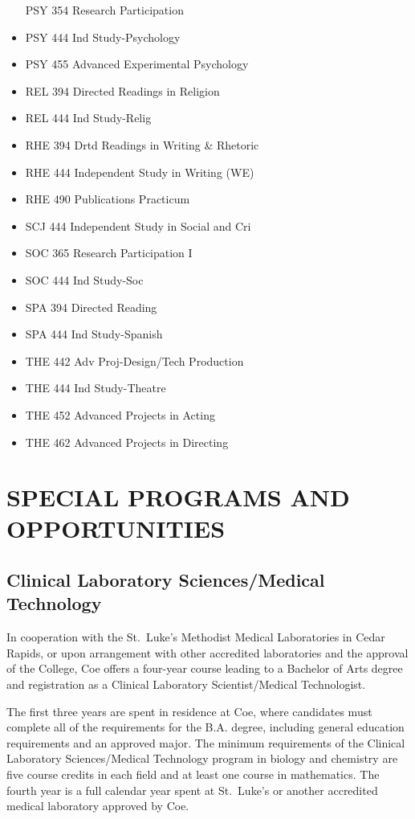 \documentclass[
  letterpaper,
]{scrbook}
\begin{document}
\begin{itemize}
  PSY 354 Research Participation
\item
  PSY 444 Ind Study-Psychology
\item
  PSY 455 Advanced Experimental Psychology
\item
  REL 394 Directed Readings in Religion
\item
  REL 444 Ind Study-Relig
\item
  RHE 394 Drtd Readings in Writing \& Rhetoric
\item
  RHE 444 Independent Study in Writing (WE)
\item
  RHE 490 Publications Practicum
\item
  SCJ 444 Independent Study in Social and Cri
\item
  SOC 365 Research Participation I
\item
  SOC 444 Ind Study-Soc
\item
  SPA 394 Directed Reading
\item
  SPA 444 Ind Study-Spanish
\item
  THE 442 Adv Proj-Design/Tech Production
\item
  THE 444 Ind Study-Theatre
\item
  THE 452 Advanced Projects in Acting
\item
  THE 462 Advanced Projects in Directing
\end{itemize}

\hypertarget{special-programs-and-opportunities}{%
\chapter{SPECIAL PROGRAMS AND
OPPORTUNITIES}\label{special-programs-and-opportunities}}

\hypertarget{clinical-laboratory-sciencesmedical-technology}{%
\section{Clinical Laboratory Sciences/Medical
Technology}\label{clinical-laboratory-sciencesmedical-technology}}

In cooperation with the St.~Luke's Methodist Medical Laboratories in
Cedar Rapids, or upon arrangement with other accredited laboratories and
the approval of the College, Coe offers a four-year course leading to a
Bachelor of Arts degree and registration as a Clinical Laboratory
Scientist/Medical Technologist.

The first three years are spent in residence at Coe, where candidates
must complete all of the requirements for the B.A. degree, including
general education requirements and an approved major. The minimum
requirements of the Clinical Laboratory Sciences/Medical Technology
program in biology and chemistry are five course credits in each field
and at least one course in mathematics. The fourth year is a full
calendar year spent at St.~Luke's or another accredited medical
laboratory approved by Coe.
\end{document}
